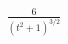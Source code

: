 \documentclass[preview]{standalone}
\begin{document}
\begin{align*}
\frac{6}{(t^2+1)^{3/2}}
\end{align*}
\end{document}
